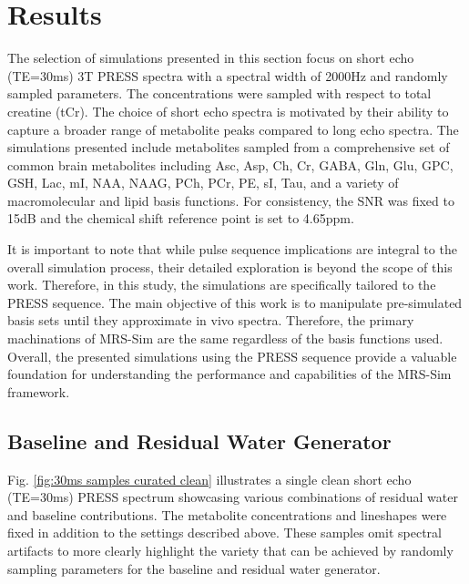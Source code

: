 \section{Results}\label{sec:Results}
The selection of simulations presented in this section focus on short echo (TE=30ms) 3T PRESS spectra with a spectral width of 2000Hz and randomly sampled parameters. The concentrations were sampled with respect to total creatine (tCr). The choice of short echo spectra is motivated by their ability to capture a broader range of metabolite peaks compared to long echo spectra. The simulations presented include metabolites sampled from a comprehensive set of common brain metabolites including Asc, Asp, Ch, Cr, GABA, Gln, Glu, GPC, GSH, Lac, mI, NAA, NAAG, PCh, PCr, PE, sI, Tau, and a variety of macromolecular and lipid basis functions. For consistency, the SNR was fixed to 15dB and the chemical shift reference point is set to 4.65ppm.

It is important to note that while pulse sequence implications are integral to the overall simulation process, their detailed exploration is beyond the scope of this work. Therefore, in this study, the simulations are specifically tailored to the PRESS sequence. 
The main objective of this work is to manipulate pre-simulated basis sets until they approximate in vivo spectra. Therefore, the primary machinations of MRS-Sim are the same regardless of the basis functions used. Overall, the presented simulations using the PRESS sequence provide a valuable foundation for understanding the performance and capabilities of the MRS-Sim framework.

\subsection{Baseline and Residual Water Generator}


Fig. \ref{fig:30ms samples curated clean} illustrates a single clean short echo (TE=30ms) PRESS spectrum showcasing various combinations of residual water and baseline contributions. The metabolite concentrations and lineshapes were fixed in addition to the settings described above. These samples omit spectral artifacts to more clearly highlight the variety that can be achieved by randomly sampling parameters for the baseline and residual water generator. 

